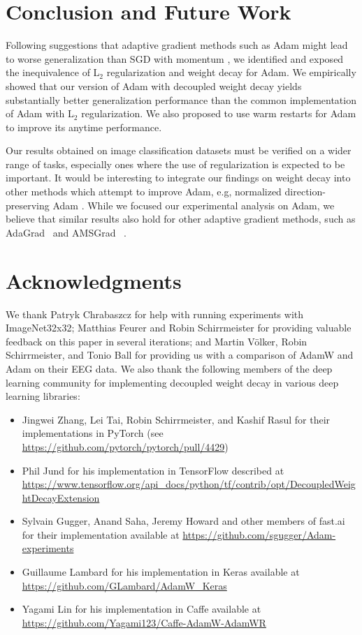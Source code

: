 \documentclass[usenames,dvipsnames]{article}
\begin{document}
\section{Conclusion and Future Work}

Following suggestions that adaptive gradient methods such as Adam might lead to worse generalization than SGD with momentum \citep{wilson2017marginal}, we identified and exposed 
the inequivalence of L$_2$ regularization and weight decay for Adam. 
We empirically showed that our version of Adam with decoupled weight decay 
yields substantially better generalization performance than the common implementation of Adam with L$_2$ regularization. We also proposed to use warm restarts for Adam to improve its anytime  performance. 

Our results obtained on image classification datasets must be verified on a wider range of tasks, especially ones where the use of regularization is expected to be important. It would be interesting to integrate our findings on weight decay into other methods which attempt to improve Adam, e.g, normalized direction-preserving Adam \citep{zhang2017normalized}. 
While we focused our experimental analysis on Adam, we believe that similar results also hold for other adaptive gradient methods, such as AdaGrad~\citep{duchi2011adaptive} and AMSGrad ~\citep{reddi2018iclr}.

\section{Acknowledgments}

We thank Patryk Chrabaszcz for help with running experiments with ImageNet32x32; Matthias Feurer and Robin Schirrmeister for providing valuable feedback on this paper in several iterations; and Martin V\"{o}lker, Robin Schirrmeister, and Tonio Ball for providing us with a comparison of AdamW and Adam on their EEG data. 
We also thank the following members of the deep learning community for implementing decoupled weight decay in various deep learning libraries: 
\newcommand{\denselist}{\itemsep 0pt\partopsep -20pt}
\begin{itemize}
\denselist
\item Jingwei Zhang, Lei Tai, Robin Schirrmeister, and Kashif Rasul for their implementations in PyTorch (see \url{https://github.com/pytorch/pytorch/pull/4429})
\item Phil Jund for his implementation in TensorFlow described at\\ \url{https://www.tensorflow.org/api_docs/python/tf/contrib/opt/DecoupledWeightDecayExtension} 
\item Sylvain Gugger, Anand Saha, Jeremy Howard and other members of fast.ai for their implementation available at \url{https://github.com/sgugger/Adam-experiments}
\item Guillaume Lambard for his implementation in Keras available at \url{ https://github.com/GLambard/AdamW_Keras  }
\item Yagami Lin for his implementation in Caffe available at \url{ https://github.com/Yagami123/Caffe-AdamW-AdamWR  }
\end{itemize}
\end{document}
